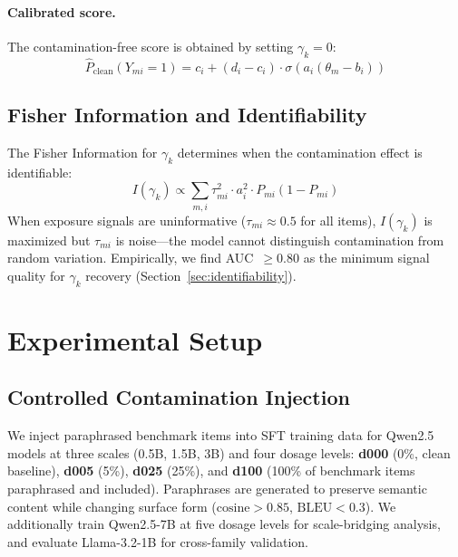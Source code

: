 \documentclass[11pt]{article}
\begin{document}
\paragraph{Calibrated score.}
The contamination-free score is obtained by setting $\gamma_k = 0$:
\begin{equation}
\hat{P}_{\text{clean}}(Y_{mi} = 1) = c_i + (d_i - c_i) \cdot \sigma\!\left(a_i(\theta_m - b_i)\right)
\end{equation}

\subsection{Fisher Information and Identifiability}

The Fisher Information for $\gamma_k$ determines when the contamination effect is identifiable:
\begin{equation}
I(\gamma_k) \propto \sum_{m,i} \tau_{mi}^2 \cdot a_i^2 \cdot P_{mi}(1 - P_{mi})
\end{equation}
When exposure signals are uninformative ($\tau_{mi} \approx 0.5$ for all items), $I(\gamma_k)$ is maximized but $\tau_{mi}$ is noise---the model cannot distinguish contamination from random variation.
Empirically, we find AUC~$\geq 0.80$ as the minimum signal quality for $\gamma_k$ recovery (Section~\ref{sec:identifiability}).


\section{Experimental Setup}
\label{sec:setup}

\subsection{Controlled Contamination Injection}

We inject paraphrased benchmark items into SFT training data for Qwen2.5 models at three scales (0.5B, 1.5B, 3B) and four dosage levels:
\textbf{d000} (0\%, clean baseline), \textbf{d005} (5\%), \textbf{d025} (25\%), and \textbf{d100} (100\% of benchmark items paraphrased and included).
Paraphrases are generated to preserve semantic content while changing surface form ($\text{cosine} > 0.85$, $\text{BLEU} < 0.3$).
We additionally train Qwen2.5-7B at five dosage levels for scale-bridging analysis, and evaluate Llama-3.2-1B for cross-family validation.
\end{document}
